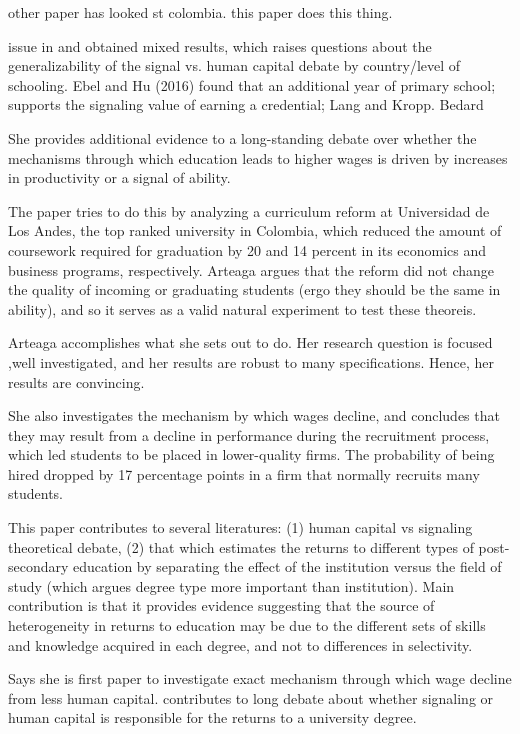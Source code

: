 \documentclass[a4paper, 11pt]{article}
\begin{document}
other paper has looked st colombia.  this paper does this thing.

 issue in and obtained mixed results, which raises questions about the generalizability of the signal vs. human capital debate by country/level of schooling.  Ebel and Hu (2016) found that an additional year of primary school; supports the signaling value of earning a credential; Lang and Kropp. Bedard 



She provides additional evidence to a long-standing debate over whether the mechanisms through which education leads to higher wages is driven by increases in productivity or a signal of ability.

The paper tries to do this by analyzing a curriculum reform at Universidad de Los Andes, the top ranked university in Colombia, which reduced the amount of coursework required for graduation by 20 and 14 percent in its economics and business programs, respectively.   Arteaga argues that the reform did not change the quality of incoming or graduating students (ergo they should be the same in ability), and so it serves as a valid natural experiment to test these theoreis.

Arteaga accomplishes what she sets out to do. Her research question is focused ,well investigated, and her results are robust to many specifications.  Hence, her results are convincing.

  She also investigates the mechanism by which wages decline, and concludes that they may result from a decline in performance during the recruitment process, which led students to be placed in lower-quality firms.  The probability of being hired dropped by 17 percentage points in a firm that normally recruits many students.



This paper contributes to several literatures: (1) human capital vs signaling theoretical debate, (2) that which estimates the returns to different types of post-secondary education by separating the effect of the institution versus the field of study (which argues degree type more important than institution). Main contribution is that it provides evidence suggesting that the source of heterogeneity in returns to education may be due to the different sets of skills and knowledge acquired in each degree, and not to differences in selectivity.

Says she is first paper to investigate exact mechanism through which wage decline from less human capital.   contributes to long debate about whether signaling or human capital is responsible for the returns to a university degree.
\end{document}
